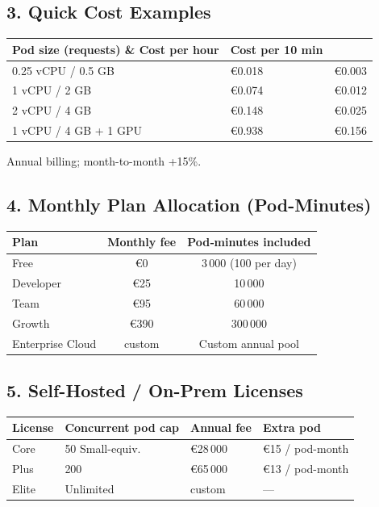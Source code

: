 \documentclass[11pt, a4paper, oneside]{article}
\begin{document}
\subsection*{3. Quick Cost Examples}
\begin{center}
\begin{tabular}{@{}lll@{}}
\toprule
\textbf{Pod size (requests)} \& \textbf{Cost per hour} & \textbf{Cost per 10 min} \\
\midrule
0.25 vCPU / 0.5 GB & €0.018 & €0.003 \\
1 vCPU / 2 GB & €0.074 & €0.012 \\
2 vCPU / 4 GB & €0.148 & €0.025 \\
1 vCPU / 4 GB + 1 GPU & €0.938 & €0.156 \\
\bottomrule
\end{tabular}
\end{center}


\smallskip
\noindent *Annual billing; month-to-month +15\%.


\subsection*{4. Monthly Plan Allocation (Pod-Minutes)}
\begin{center}
\begin{tabular}{@{}lcc@{}}
\toprule
\textbf{Plan} & \textbf{Monthly fee} & \textbf{Pod‑minutes included} \\
\midrule
Free        & €0    & 3\,000 (100 per day) \\
Developer   & €25   & 10\,000 \\
Team        & €95   & 60\,000 \\
Growth      & €390  & 300\,000 \\
Enterprise Cloud & custom  & Custom annual pool \\
\bottomrule
\end{tabular}
\end{center}

\subsection*{5. Self-Hosted / On-Prem Licenses}
\begin{center}
\begin{tabular}{@{}llll@{}}
\toprule
\textbf{License} & \textbf{Concurrent pod cap} & \textbf{Annual fee} & \textbf{Extra pod} \\
\midrule
Core & 50 Small-equiv. & €28\,000 & €15 / pod-month \\
Plus & 200 & €65\,000 & €13 / pod-month \\
Elite & Unlimited & custom & --- \\
\bottomrule
\end{tabular}
\end{center}
\end{document}
